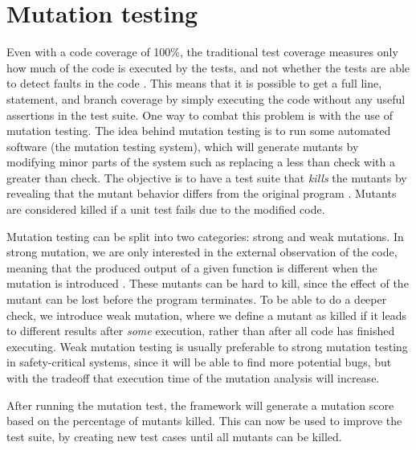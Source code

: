 \section{Mutation testing}
Even with a code coverage of 100\%, the traditional test coverage measures only how much of the code is executed by the tests, and not whether the tests are able to detect faults in the code \cite{pitest}.
This means that it is possible to get a full line, statement, and branch coverage by simply executing the code without any useful assertions in the test suite.
One way to combat this problem is with the use of mutation testing.
The idea behind mutation testing is to run some automated software (the mutation testing system), which will generate mutants by modifying minor parts of the system such as replacing a less than check with a greater than check.
The objective is to have a test suite that \textit{kills} the mutants by revealing that the mutant behavior differs from the original program \cite{mutationtesting}.
Mutants are considered killed if a unit test fails due to the modified code.

Mutation testing can be split into two categories: strong and weak mutations.
In strong mutation, we are only interested in the external observation of the code, meaning that the produced output of a given function is different when the mutation is introduced \cite{mutationtesting}.
These mutants can be hard to kill, since the effect of the mutant can be lost before the program terminates.
To be able to do a deeper check, we introduce weak mutation, where we define a mutant as killed if it leads to different results after \textit{some} execution, rather than after all code has finished executing.
Weak mutation testing is usually preferable to strong mutation testing in safety-critical systems, since it will be able to find more potential bugs, but with the tradeoff that execution time of the mutation analysis will increase.

After running the mutation test, the framework will generate a mutation score based on the percentage of mutants killed.
This can now be used to improve the test suite, by creating new test cases until all mutants can be killed.
